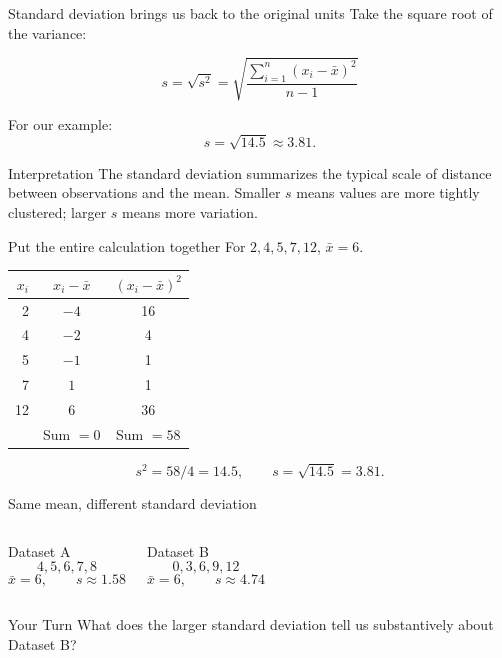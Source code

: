 \documentclass[11pt,aspectratio=169]{beamer}
\newcommand{\yourturn}[1]{%
\begin{center}
\begin{minipage}{0.90\textwidth}
\begin{alertblock}{Your Turn}
#1
\end{alertblock}
\end{minipage}
\end{center}}
\begin{document}
\begin{frame}{Standard deviation brings us back to the original units}
Take the square root of the variance:

\[
\boxed{s=\sqrt{s^2}=\sqrt{\frac{\sum_{i=1}^{n}(x_i-\bar{x})^2}{n-1}}}
\]

For our example:
\[
s=\sqrt{14.5}\approx\boxed{3.81}.
\]

\vfill
\begin{alertblock}{Interpretation}
The standard deviation summarizes the typical scale of distance between observations and the mean. Smaller $s$ means values are more tightly clustered; larger $s$ means more variation.
\end{alertblock}
\end{frame}

\begin{frame}{Put the entire calculation together}
For $2,4,5,7,12$, $\bar{x}=6$.

\begin{center}
\renewcommand{\arraystretch}{1.25}
\begin{tabular}{rcc}
\toprule
$x_i$ & $x_i-\bar{x}$ & $(x_i-\bar{x})^2$ \\
\midrule
2 & $-4$ & 16 \\
4 & $-2$ & 4 \\
5 & $-1$ & 1 \\
7 & $1$ & 1 \\
12 & $6$ & 36 \\
\midrule
 & Sum $=0$ & Sum $=58$ \\
\bottomrule
\end{tabular}
\end{center}

\[
s^2=58/4=14.5,\qquad s=\sqrt{14.5}=3.81.
\]
\end{frame}

\begin{frame}{Same mean, different standard deviation}
\begin{columns}[T,onlytextwidth]
\begin{block}{Dataset A}
\[
4,5,6,7,8
\]
\[
\bar{x}=6,\qquad s\approx1.58
\]
\end{block}
\begin{block}{Dataset B}
\[
0,3,6,9,12
\]
\[
\bar{x}=6,\qquad s\approx4.74
\]
\end{block}
\end{columns}

\vfill
\yourturn{What does the larger standard deviation tell us substantively about Dataset B?}
\end{frame}
\end{document}
